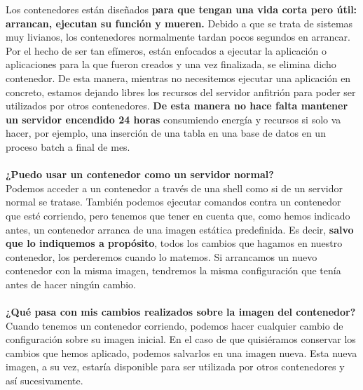 \documentclass[twoside,twocolumn]{article}
\begin{document}
\begin{flushright}
\begin{itemize}
Los contenedores están diseñados \textbf{para que tengan una vida corta pero útil: arrancan, ejecutan su función y mueren.} Debido a que se trata de sistemas muy livianos, los contenedores normalmente tardan pocos segundos en arrancar. Por el hecho de ser tan efímeros, están enfocados a ejecutar la aplicación o aplicaciones para la que fueron creados y una vez finalizada, se elimina dicho contenedor. De esta manera, mientras no necesitemos ejecutar una aplicación en concreto, estamos dejando libres los recursos del servidor anfitrión para poder ser utilizados por otros contenedores. \textbf{De esta manera no hace falta mantener un servidor encendido 24 horas} consumiendo energía y recursos si solo va hacer, por ejemplo, una inserción de una tabla en una base de datos en un proceso batch a final de mes.
\textbf{}\\
\textbf{}\\
\textbf{¿Puedo usar un contenedor como un servidor normal?}\\
Podemos acceder a un contenedor a través de una shell como si de un servidor normal se tratase. También podemos ejecutar comandos contra un contenedor que esté corriendo, pero tenemos que tener en cuenta que, como hemos indicado antes, un contenedor arranca de una imagen estática predefinida. Es decir, \textbf{salvo que lo indiquemos a propósito}, todos los cambios que hagamos en nuestro contenedor, los perderemos cuando lo matemos. Si arrancamos un nuevo contenedor con la misma imagen, tendremos la misma configuración que tenía antes de hacer ningún cambio.
\textbf{}\\
\textbf{}\\
\textbf{¿Qué pasa con mis cambios realizados sobre la imagen del contenedor?}\\
Cuando tenemos un contenedor corriendo, podemos hacer cualquier cambio de configuración sobre su imagen inicial. En el caso de que quisiéramos conservar los cambios que hemos aplicado, podemos salvarlos en una imagen nueva. Esta nueva imagen, a su vez, estaría disponible para ser utilizada por otros contenedores y así sucesivamente.

\textbf{}\\
\textbf{}\\


\end{itemize}
\end{flushright}
\end{document}
